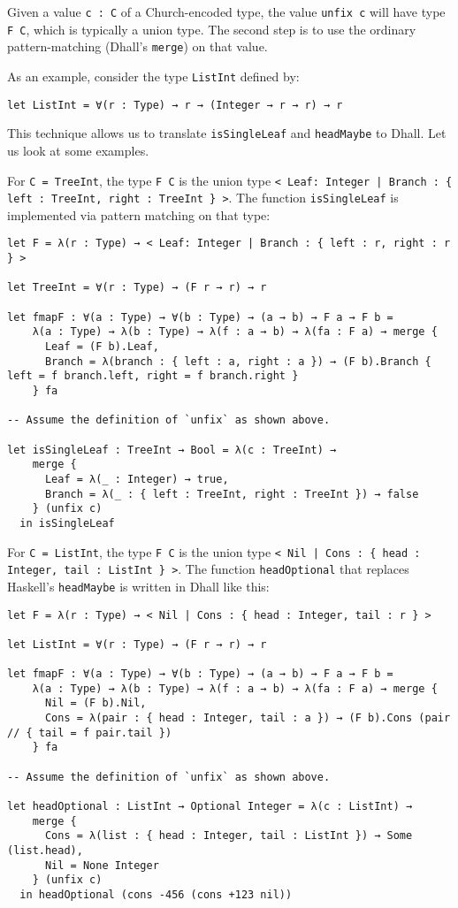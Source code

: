 Given a value \lstinline!c : C! of a Church-encoded type, the value \lstinline!unfix c! will have type \lstinline!F C!, which is typically a union type.
The second step is to use the ordinary pattern-matching (Dhall's \lstinline!merge!) on that value.


As an example, consider the type \lstinline!ListInt! defined by:


\begin{lstlisting}[language=Dhall]
let ListInt = ∀(r : Type) → r → (Integer → r → r) → r
\end{lstlisting}


This technique allows us to translate \lstinline!isSingleLeaf! and \lstinline!headMaybe! to Dhall. Let us look at some examples.


For \lstinline!C = TreeInt!, the type \lstinline!F C! is the union type \lstinline!< Leaf: Integer | Branch : { left : TreeInt, right : TreeInt } >!. The function \lstinline!isSingleLeaf! is
implemented via pattern matching on that type:


\begin{lstlisting}[language=Dhall]
let F = λ(r : Type) → < Leaf: Integer | Branch : { left : r, right : r } >

let TreeInt = ∀(r : Type) → (F r → r) → r

let fmapF : ∀(a : Type) → ∀(b : Type) → (a → b) → F a → F b =
    λ(a : Type) → λ(b : Type) → λ(f : a → b) → λ(fa : F a) → merge {
      Leaf = (F b).Leaf,
      Branch = λ(branch : { left : a, right : a }) → (F b).Branch { left = f branch.left, right = f branch.right }
    } fa

-- Assume the definition of `unfix` as shown above.

let isSingleLeaf : TreeInt → Bool = λ(c : TreeInt) →
    merge {
      Leaf = λ(_ : Integer) → true,
      Branch = λ(_ : { left : TreeInt, right : TreeInt }) → false
    } (unfix c)
  in isSingleLeaf
\end{lstlisting}


For \lstinline!C = ListInt!, the type \lstinline!F C! is the union type \lstinline!< Nil | Cons : { head : Integer, tail : ListInt } >!. The function \lstinline!headOptional! that replaces
Haskell's \lstinline!headMaybe! is written in Dhall like this:


\begin{lstlisting}[language=Dhall]
let F = λ(r : Type) → < Nil | Cons : { head : Integer, tail : r } >

let ListInt = ∀(r : Type) → (F r → r) → r

let fmapF : ∀(a : Type) → ∀(b : Type) → (a → b) → F a → F b =
    λ(a : Type) → λ(b : Type) → λ(f : a → b) → λ(fa : F a) → merge {
      Nil = (F b).Nil,
      Cons = λ(pair : { head : Integer, tail : a }) → (F b).Cons (pair // { tail = f pair.tail })
    } fa

-- Assume the definition of `unfix` as shown above.

let headOptional : ListInt → Optional Integer = λ(c : ListInt) →
    merge {
      Cons = λ(list : { head : Integer, tail : ListInt }) → Some (list.head),
      Nil = None Integer
    } (unfix c)
  in headOptional (cons -456 (cons +123 nil))
\end{lstlisting}


